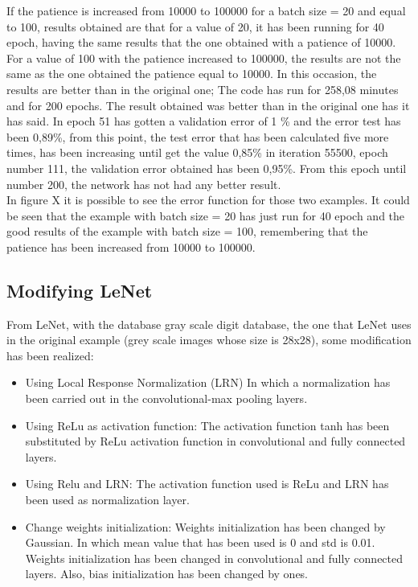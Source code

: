 If the patience is increased from 10000 to 100000 for a batch size = 20 and equal to 100, results obtained are that for a value of 20, it has been running for 40 epoch, having the same results that the one obtained with a patience of 10000.\\

 For a value of 100 with the patience increased to 100000, the results are not the same as the one obtained the patience equal to 10000. In this occasion, the results are better than in the original one; The code has run for 258,08 minutes and for 200 epochs. The result obtained was better than in the original one has it has said. In epoch 51 has gotten a validation error of  1 \% and the error test has been 0,89\%, from this point, the test error that has been calculated five more times, has been increasing until get the value 0,85\% in iteration 55500, epoch number 111, the validation error obtained has been 0,95\%. From this epoch until number 200, the network has not had any better result.\\
 
In figure X it is possible to see the error function for those two examples. It could be seen that the example with batch size = 20 has just run for 40 epoch and the good results of the example with batch size = 100, remembering that the patience has been increased from 10000 to 100000.\\

\clearpage
\subsection{Modifying LeNet}
From LeNet, with the database gray scale digit database, the one that LeNet uses in the original example (grey scale images whose size is 28x28), some modification has been realized:\\

\begin{itemize}
\item{Using Local Response Normalization (LRN) In which a normalization has been carried out in the convolutional-max pooling layers.}
\item{Using ReLu as activation function:} The activation function tanh has been substituted by ReLu activation function in convolutional and fully connected layers.
\item{Using Relu and LRN}: The activation function used is ReLu and LRN has been used as  normalization layer.
\item{Change weights initialization}: Weights initialization has been changed by Gaussian. In which mean value that has been used is 0 and std is 0.01. Weights initialization has been changed in convolutional and fully connected layers. Also, bias initialization has been changed by ones.
\end{itemize}

